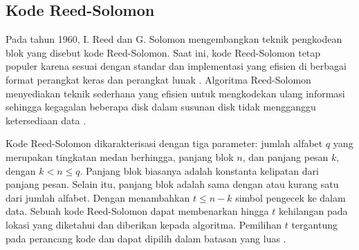 \subsection{Kode Reed-Solomon}

Pada tahun 1960, I. Reed dan G. Solomon mengembangkan teknik pengkodean blok yang disebut kode Reed-Solomon. Saat ini, kode Reed-Solomon tetap populer karena sesuai dengan standar dan implementasi yang efisien di berbagai format perangkat keras dan perangkat lunak \parencite{minio2022erasure}. Algoritma Reed-Solomon menyediakan teknik sederhana yang efisien untuk mengkodekan ulang informasi sehingga kegagalan beberapa disk dalam susunan disk tidak mengganggu ketersediaan data \parencite{manasse2009reed}.



Kode Reed-Solomon dikarakterisasi dengan tiga parameter: jumlah alfabet $q$ yang merupakan tingkatan medan berhingga, panjang blok $n$, dan panjang pesan $k$, dengan $k < n \le q$. Panjang blok biasanya adalah konstanta kelipatan dari panjang pesan. Selain itu, panjang blok adalah sama dengan atau kurang satu dari jumlah alfabet. Dengan menambahkan $t \le n - k$ simbol pengecek ke dalam data. Sebuah kode Reed-Solomon dapat membenarkan hingga $t$ kehilangan pada lokasi yang diketahui dan diberikan kepada algoritma. Pemilihan $t$ tergantung pada perancang kode dan dapat dipilih dalam batasan yang luas \parencite{riley2001introduction}.

